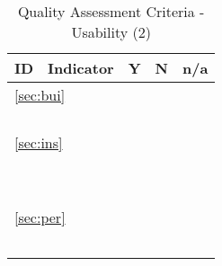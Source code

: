 \documentclass[a4paper,11pt]{article}
\begin{document}
\begin{table}[hbt]
	\begin{tabular}
		{ p{} | 
			p{} |
			p{} |
			p{} |
			p{} }
		\hline
		\textbf{ID} & \textbf{Indicator} & \textbf{Y} & \textbf{N} & \textbf{n/a} \\
        \hline
        \multicolumn{5}{l}{\ref{sec:bui}{ }\nameref{sec:bui}} \\
		\hline
		\hyperref[id:b1]{\bOneID} & \bOneText & & & \\
		\hyperref[id:b2]{\bTwoID} & \bTwoText & & & \\
		\hyperref[id:b3]{\bThreeID} & \bThreeText & & & \\
		\hyperref[id:b4]{\bFourID} & \bFourText & & & \\
		\hline			
		\multicolumn{5}{l}{\ref{sec:ins}{ }\nameref{sec:ins}} \\
		\hline
		\hyperref[id:is1]{\isOneID} & \isOneText & & & \\
		\hyperref[id:is2]{\isTwoID} & \isTwoText & & & \\
		\hyperref[id:is3]{\isThreeID} & \isThreeText & & & \\
		\hyperref[id:is4]{\isFourID} & \isFourText & & & \\
		\hyperref[id:is5]{\isFiveID} & \isFiveText & & & \\
		\hyperref[id:is6]{\isSixID} & \isSixText & & & \\
		\hyperref[id:is7]{\isSevenID} & \isSevenText & & & \\
		\hyperref[id:is8]{\isEightID} & \isEightText & & & \\
		\hyperref[id:is9]{\isNineID} & \isNineText & & & \\
		\hline
		\multicolumn{5}{l}{\ref{sec:per}{ }\nameref{sec:per}} \\
		\hline	
		\hyperref[id:pf1]{\pfOneID} & \pfOneText & & & \\
		\hyperref[id:pf2]{\pfTwoID} & \pfTwoText & & & \\
		\hyperref[id:pf3]{\pfThreeID} & \pfThreeText & & & \\
		\hyperref[id:pf4]{\pfFourID} & \pfFourText & & & \\
		\hyperref[id:pf5]{\pfFiveID} & \pfFiveText & & & \\
		\hline		
		\end{tabular}
		\caption{Quality Assessment Criteria - Usability (2)}
		\label{tab:criteriaUsab2}
\end{table}
\end{document}
